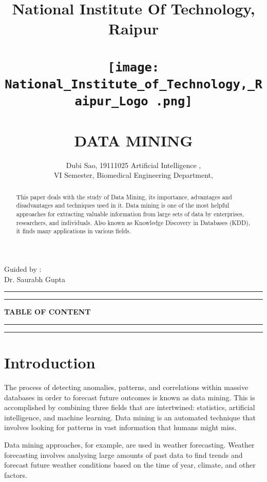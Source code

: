 \documentclass[12pt,letterpaper]{article}
\begin{document}
\title{
\textbf{National Institute Of Technology, Raipur\\ 
 \\ \texttt{[image: National\_Institute\_of\_Technology,\_Raipur\_Logo .png]}
\\ \\
DATA MINING}
}

\author{Dubi Sao, 19111025 
Artificial Intelligence ,\\ VI Semester,
        Biomedical Engineering Department,\\
        }
\date{}
\maketitle
\begin{flushright}
    Guided by :\\
    Dr. Saurabh Gupta
\end{flushright}
\rule{\textwidth}{1pt}
\begin{abstract}
This paper deals with the study of Data Mining, its importance, advantages and disadvantages and techniques used in it. Data mining is one of the most helpful approaches for extracting valuable information from large sets of data by enterprises, researchers, and individuals. Also known as Knowledge Discovery in Databases (KDD), it finds many applications in various fields.


\end{abstract}
\rule{\textwidth}{1pt}
\newpage
\textbf{TABLE OF CONTENT}\\
\rule{\textwidth}{1pt}
\tableofcontents
\rule{\textwidth}{1pt}

\section{Introduction}
The process of detecting anomalies, patterns, and correlations within massive databases in order to forecast future outcomes is known as data mining. This is accomplished by combining three fields that are intertwined: statistics, artificial intelligence, and machine learning. Data mining is an automated technique that involves looking for patterns in vast information that humans might miss.


Data mining approaches, for example, are used in weather forecasting. Weather forecasting involves analysing large amounts of past data to find trends and forecast future weather conditions based on the time of year, climate, and other factors.
\end{document}
